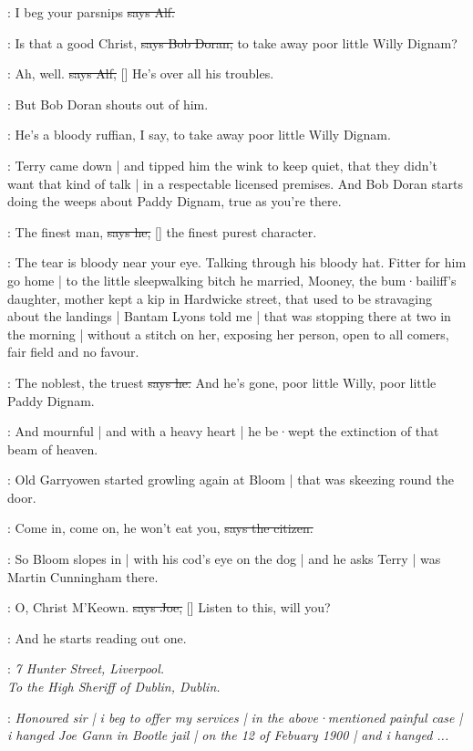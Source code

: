 \bergan:
I beg your parsnips
\sout{says Alf.}

\doran:
Is that a good Christ,
\sout{says Bob Doran,}
to take away poor little Willy Dignam?

\bergan:
Ah,
well.
\sout{says Alf,}
[]
He's over all his troubles.

\Nq:
But Bob Doran shouts out of him.

\doran:
He's a bloody ruffian,
I say,
to take away poor little Willy Dignam.

\Nq:
Terry came down |
and tipped him the wink to keep quiet,
that they didn't want that kind of talk |
in a respectable licensed premises.
And Bob Doran starts doing the weeps about Paddy Dignam,
true as you're there.

\doran:
The finest man,
\sout{says he,}
[]
the finest purest character.

\Nq:
The tear is bloody near your eye.
Talking through his bloody hat.
Fitter for him go home |
to the little sleepwalking bitch he married,
Mooney,
the bum·bailiff's daughter,
mother kept a kip in Hardwicke street,
that used to be stravaging about the landings
 |
Bantam Lyons told me |
that was stopping there at two in the morning |
without a stitch on her,
exposing her person,
open to all comers,
fair field and no favour.

\doran:
The noblest,
the truest
\sout{says he.}
And he's gone,
poor little Willy,
poor little Paddy Dignam.

:
And mournful |
and with a heavy heart |
he be·wept the extinction of that beam of heaven.

\Nq:
Old Garryowen started growling again at Bloom |
that was skeezing round the door.

\citizen:
Come in,
come on,
he won't eat you,
\sout{says the citizen.}

\Nq:
So Bloom slopes in |
with his cod's eye on the dog
 |
and he asks Terry |
was Martin Cunningham there.

\joe:
O,
Christ M'Keown.
\sout{says Joe,}
[]
Listen to this,
will you?

\Nq:
And he starts reading out one.


\joe:
\emph{7 Hunter Street,
Liverpool.\\
To the High Sheriff of Dublin,
Dublin.}

\joe:
\emph{Honoured sir |
i beg to offer my services |
in the above·mentioned painful case |
i hanged Joe Gann in Bootle jail |
on the 12 of Febuary 1900
 |
and i hanged ...}

